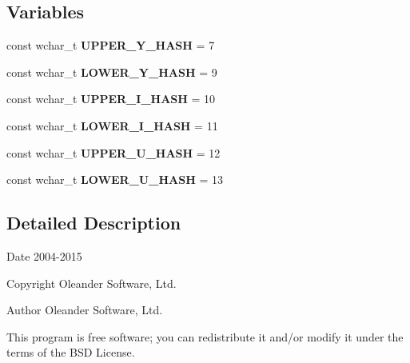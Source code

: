 \subsection*{Variables}
\begin{DoxyCompactItemize}
\item 
\hypertarget{namespacestemming_a5d720e7c3e7ec49b57a7b39cfaba90af}{const wchar\-\_\-t {\bfseries U\-P\-P\-E\-R\-\_\-\-Y\-\_\-\-H\-A\-S\-H} = 7}\label{namespacestemming_a5d720e7c3e7ec49b57a7b39cfaba90af}

\item 
\hypertarget{namespacestemming_af29db03997ddc958253bf6aab7cd8985}{const wchar\-\_\-t {\bfseries L\-O\-W\-E\-R\-\_\-\-Y\-\_\-\-H\-A\-S\-H} = 9}\label{namespacestemming_af29db03997ddc958253bf6aab7cd8985}

\item 
\hypertarget{namespacestemming_a275ebb867508b45937921885d0a37f65}{const wchar\-\_\-t {\bfseries U\-P\-P\-E\-R\-\_\-\-I\-\_\-\-H\-A\-S\-H} = 10}\label{namespacestemming_a275ebb867508b45937921885d0a37f65}

\item 
\hypertarget{namespacestemming_a7454947ea4acf69afb5c54094c257ff4}{const wchar\-\_\-t {\bfseries L\-O\-W\-E\-R\-\_\-\-I\-\_\-\-H\-A\-S\-H} = 11}\label{namespacestemming_a7454947ea4acf69afb5c54094c257ff4}

\item 
\hypertarget{namespacestemming_a05756eb1c8cd1fafce3981d8a7222cac}{const wchar\-\_\-t {\bfseries U\-P\-P\-E\-R\-\_\-\-U\-\_\-\-H\-A\-S\-H} = 12}\label{namespacestemming_a05756eb1c8cd1fafce3981d8a7222cac}

\item 
\hypertarget{namespacestemming_a9b593f99cd2777a364983cd5f9dbe1ef}{const wchar\-\_\-t {\bfseries L\-O\-W\-E\-R\-\_\-\-U\-\_\-\-H\-A\-S\-H} = 13}\label{namespacestemming_a9b593f99cd2777a364983cd5f9dbe1ef}

\end{DoxyCompactItemize}


\subsection{Detailed Description}
\begin{DoxyDate}{Date}
2004-\/2015 
\end{DoxyDate}
\begin{DoxyCopyright}{Copyright}
Oleander Software, Ltd. 
\end{DoxyCopyright}
\begin{DoxyAuthor}{Author}
Oleander Software, Ltd.
\end{DoxyAuthor}
This program is free software; you can redistribute it and/or modify it under the terms of the B\-S\-D License.

